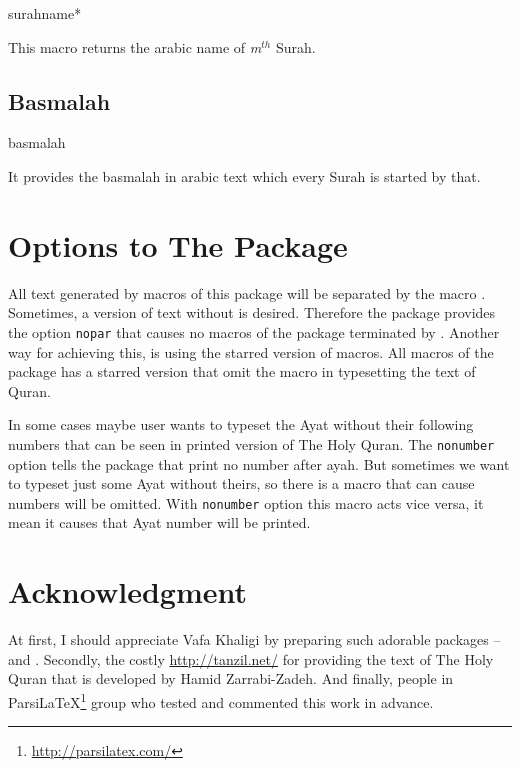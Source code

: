 \documentclass{ltxdoc}
\begin{document}
\begin{declcs}{surahname*}
\end{declcs}
This macro returns the arabic name of \textit{m}$^{th}$ Surah.

\subsection{Basmalah}
\begin{declcs}{basmalah}
\end{declcs}
It provides the basmalah in arabic text which every Surah is started by that.

\section{Options to The Package}
All text generated by macros of this package will be separated by the macro . Sometimes, 
a version of text without  is desired. Therefore the package provides the option 
\texttt{nopar}
that causes no macros of the package terminated by .
Another way for achieving this, is using the starred version of macros. All macros of the package
has a starred version that omit the  macro in typesetting the text of Quran. 

In some cases maybe user wants to typeset the Ayat without their following numbers that can be seen in printed version of The Holy Quran. The \texttt{nonumber} 
option tells the package that print no number after ayah.
But sometimes we want to typeset just some Ayat without theirs, so there is a  macro
that can cause numbers will be omitted. With \texttt{nonumber} option this macro acts vice versa, it mean it 
causes that Ayat number will be printed.

\section{Acknowledgment}
At first, I should appreciate Vafa Khaligi by preparing such adorable packages -- and 
. Secondly, the costly \url{http://tanzil.net/} for providing the text of The Holy Quran that 
is developed by Hamid Zarrabi-Zadeh. And finally, people in Parsi\LaTeX\footnote{\url{http://parsilatex.com/}}
group who tested and commented this work in advance. 
\end{document}
